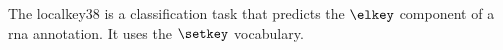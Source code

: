 
The \gls{localkey38} is a classification task that predicts
the $\elkey$ component of a \gls{rna} annotation. It uses
the $\setkey$ vocabulary.


